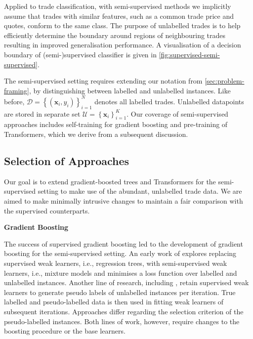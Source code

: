 Applied to trade classification, with semi-supervised methods we implicitly assume that trades with similar features, such as a common trade price and quotes, conform to the same class. The purpose of unlabelled trades is to help efficiently determine the boundary around regions of neighbouring trades resulting in improved generalisation performance. A visualisation of a decision boundary of (semi-)supervised classifier is given in \cref{fig:supervised-semi-supervised}.

The semi-supervised setting requires extending our notation from \cref{sec:problem-framing}, by distinguishing between labelled and unlabelled instances. Like before, $\mathcal{D}=\left\{\left(\mathbf{x}_i, y_i\right)\right\}_{i=1}^N$ denotes all labelled trades. Unlabelled datapoints are stored in separate set $\mathcal{U} = \left\{\mathbf{x}_i\right\}_{i=1}^{K}$. Our coverage of semi-supervised approaches includes self-training for gradient boosting and pre-training of Transformers, which we derive from a subsequent discussion.

\subsection{Selection of Approaches}\label{sec:selection-of-approaches-1}

Our goal is to extend gradient-boosted trees and Transformers for the semi-supervised setting to make use of the abundant, unlabelled trade data. We are aimed to make minimally intrusive changes to maintain a fair comparison with the supervised counterparts.


\textbf{Gradient Boosting}

The success of supervised gradient boosting led to the development of gradient boosting for the semi-supervised setting. An early work of \textcite[][3--4]{dalche-bucSemisupervisedMarginBoost2001} explores replacing supervised weak learners, i.e., regression trees, with semi-supervised weak learners, i.e., mixture models and minimises a loss function over labelled and unlabelled instances. Another line of research, including \textcites[][290--291]{bennettExploitingUnlabeledData2002}[][2003--2004]{mallapragadaSemiBoostBoostingSemiSupervised2009}, retain supervised weak learners to generate pseudo labels of unlabelled instances per iteration. True labelled and pseudo-labelled data is then used in fitting weak learners of subsequent iterations. Approaches differ regarding the selection criterion of the pseudo-labelled instances. Both lines of work, however, require changes to the boosting procedure or the base learners.

